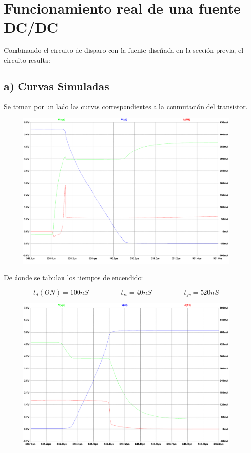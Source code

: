 \documentclass[e4_tp1_main.tex]{subfiles}
\begin{document}
\section{Funcionamiento real de una fuente DC/DC}

Combinando el circuito de disparo con la fuente diseñada en la sección previa, el circuito resulta:



\subsection*{a) Curvas Simuladas}

Se toman por un lado las curvas correspondientes a la conmutación del transistor.

\begin{figure}[H]
\centering
\includegraphics[width=0.7\linewidth]{Imagenes/Punto3/Encendido.pdf}
\end{figure}

De donde se tabulan los tiempos de encendido:

\[
t_d(ON) = 100nS \hspace{2cm} t_{ri} = 40nS \hspace{2cm} t_{fv} = 520nS
\]

\begin{figure}[H]
\centering
\includegraphics[width=0.7\linewidth]{Imagenes/Punto3/Apagado.pdf}
\end{figure}
\end{document}
